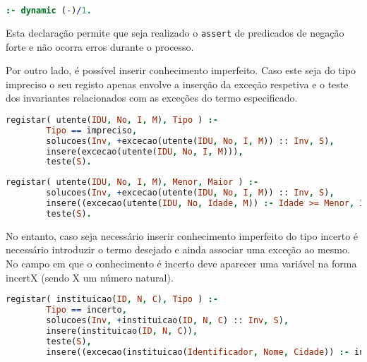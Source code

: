 \documentclass[a4paper]{article}
\begin{document}
\begin{lstlisting}[language=Prolog, caption=Primitiva que autoriza a inserção de negações fortes. ]
:- dynamic (-)/1.
\end{lstlisting}

Esta declaração permite que seja realizado o \texttt{assert} de predicados de negação forte e não ocorra erros durante o processo.

Por outro lado, é possível inserir conhecimento imperfeito. Caso este seja do tipo impreciso o seu registo apenas envolve a inserção da exceção respetiva e o teste dos invariantes relacionados com as exceções do termo especificado.

\begin{lstlisting}[language=Prolog, caption=Predicado que permite a inserção de conhecimento imperfeito do tipo impreciso no utente. ]
registar( utente(IDU, No, I, M), Tipo ) :-
        Tipo == impreciso,
        solucoes(Inv, +excecao(utente(IDU, No, I, M)) :: Inv, S),
        insere(excecao(utente(IDU, No, I, M))),
        teste(S).
\end{lstlisting}

\begin{lstlisting}[language=Prolog, caption=Predicado que permite a inserção de conhecimento imperfeito do tipo impreciso no utente na forma de intervalo. ]
registar( utente(IDU, No, I, M), Menor, Maior ) :-
        solucoes(Inv, +excecao(utente(IDU, No, I, M)) :: Inv, S),
        insere((excecao(utente(IDU, No, Idade, M)) :- Idade >= Menor, Idade =< Maior)),
        teste(S).
\end{lstlisting}

No entanto, caso seja necessário inserir conhecimento imperfeito do tipo incerto é necessário introduzir o termo desejado e ainda associar uma exceção ao mesmo. No campo em que o conhecimento é incerto deve aparecer uma variável na forma incertX (sendo X um número natural).

\begin{lstlisting}[language=Prolog, caption=Predicado que permite a inserção de conhecimento imperfeito do tipo incerto relativamente ao nome de uma instituição. ]
registar( instituicao(ID, N, C), Tipo ) :-
        Tipo == incerto,
        solucoes(Inv, +instituicao(ID, N, C) :: Inv, S),
        insere(instituicao(ID, N, C)),
        teste(S),
        insere((excecao(instituicao(Identificador, Nome, Cidade)) :- instituicao(Identificador, N, Cidade))).
\end{lstlisting}
\end{document}
